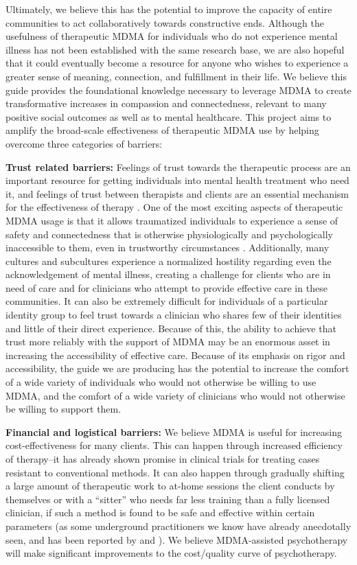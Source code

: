 \documentclass[12pt,letterpaper]{book}
\begin{document}
Ultimately, we believe this has the potential to improve the capacity of entire communities to act collaboratively towards constructive ends. Although the usefulness of therapeutic MDMA for individuals who do not experience mental illness has not been established with the same research base, we are also hopeful that it could eventually become a resource for anyone who wishes to experience a greater sense of meaning, connection, and fulfillment in their life. We believe this guide provides the foundational knowledge necessary to leverage MDMA to create transformative increases in compassion and connectedness, relevant to many positive social outcomes as well as to mental healthcare. This project aims to amplify the broad-scale effectiveness of therapeutic MDMA use by helping overcome three categories of barriers:

\textbf{Trust related barriers:} Feelings of trust towards the therapeutic process are an important resource for getting individuals into mental health treatment who need it, and feelings of trust between therapists and clients are an essential mechanism for the effectiveness of therapy \cite{wampoldCommonFactors}. One of the most exciting aspects of therapeutic MDMA usage is that it allows traumatized individuals to experience a sense of safety and connectedness that is otherwise physiologically and psychologically inaccessible to them, even in trustworthy circumstances \cite{fedduciaMDMAMemoryReconsolidation}. Additionally, many cultures and subcultures experience a normalized hostility regarding even the acknowledgement of mental illness, creating a challenge for clients who are in need of care and for clinicians who attempt to provide effective care in these communities. It can also be extremely difficult for individuals of a particular identity group to feel trust towards a clinician who shares few of their identities and little of their direct experience. Because of this, the ability to achieve that trust more reliably with the support of MDMA may be an enormous asset in increasing the accessibility of effective care. Because of its emphasis on rigor and accessibility, the guide we are producing has the potential to increase the comfort of a wide variety of individuals who would not otherwise be willing to use MDMA, and the comfort of a wide variety of clinicians who would not otherwise be willing to support them.

\textbf{Financial and logistical barriers:} We believe MDMA is useful for increasing cost-effectiveness for many clients. This can happen through increased efficiency of therapy–it has already shown promise in clinical trials for treating cases resistant to conventional methods. It can also happen through gradually shifting a large amount of therapeutic work to at-home sessions the client conducts by themselves or with a “sitter” who needs far less training than a fully licensed clinician, if such a method is found to be safe and effective within certain parameters (as some underground practitioners we know have already anecdotally seen, and has been reported by \textcite{colbertEvenings} and \textcite{hillsSolo}). We believe MDMA-assisted psychotherapy will make significant improvements to the cost/quality curve of psychotherapy.
\end{document}
